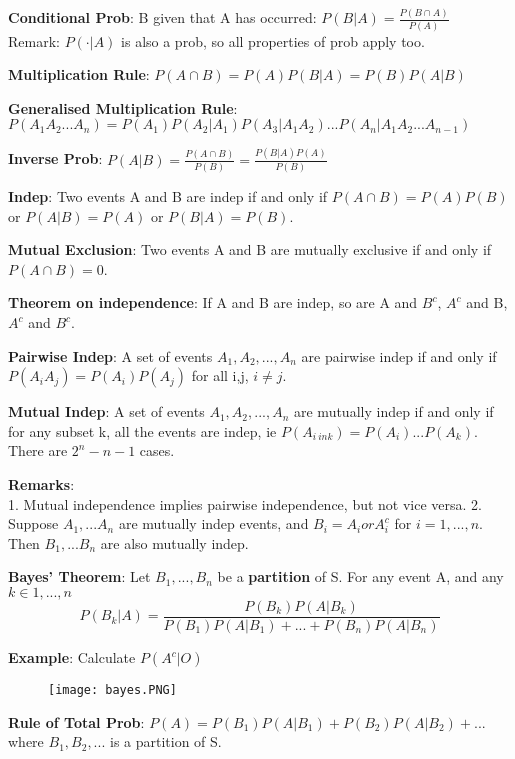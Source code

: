 \documentclass[a4paper,landscape]{article}
\newcommand{\rnname}[1]{\textbf{#1}}
\begin{document}
\begin{multicols*}{4}
\begin{flatitemize}
\item \rnname{Conditional Prob}: B given that A has occurred: $P(B|A) = \frac{P(B \cap A)}{P(A)}$ \\
Remark: $P(\cdot | A)$ is also a prob, so all properties of prob apply too.
\item \rnname{Multiplication Rule}: $P(A \cap B) = P(A)P(B|A) = P(B)P(A|B)$
\item \rnname{Generalised Multiplication Rule}: $P(A_1A_2...A_n) = P(A_1)P(A_2|A_1)P(A_3|A_1A_2)...P(A_n|A_1A_2...A_{n-1})$
\item \rnname{Inverse Prob}: $P(A|B) = \frac{P(A\cap B)}{P(B)} = \frac{P(B|A)P(A)}{P(B)}$
\item\rnname{Indep}: Two events A and B are indep if and only if $P(A\cap B) = P(A)P(B)$ or $P(A|B) = P(A)$ or $P(B|A) = P(B)$.
\item \rnname{Mutual Exclusion}: Two events A and B are mutually exclusive if and only if $P(A \cap B) = 0$.
\item \rnname{Theorem on independence}: If A and B are indep, so are A and $B^c$, $A^c$ and B, $A^c$ and $B^c$.
\item \rnname{Pairwise Indep}: A set of events $A_1,A_2,...,A_n$ are pairwise indep if and only if $P(A_iA_j) = P(A_i)P(A_j)$ for all i,j, $i \neq j$.
\item \rnname{Mutual Indep}: A set of events $A_1,A_2,...,A_n$ are mutually indep if and only if for any subset k, all the events are indep, ie $P(A_{i \ in k}) = P(A_i)...P(A_k)$. There are $2^n - n - 1$ cases.
\item \rnname{Remarks}: \\
1. Mutual independence implies pairwise independence, but not vice versa.
2. Suppose $A_1,...A_n$ are mutually indep events, and $B_i = A_i or A_i^c$ for $i = 1,...,n$. Then $B_1,...B_n$ are also mutually indep. 
\item \rnname{Bayes' Theorem}: Let $B_1, ..., B_n$ be a \textbf{partition} of S. For any event A, and any $k \in 1, ..., n$ \\
$$P(B_k|A) = \frac{P(B_k)P(A|B_k)}{P(B_1)P(A|B_1)+ ... + P(B_n)P(A|B_n)}$$
\item \rnname{Example}: Calculate $P(A^c|O)$
\vspace{-0.5cm}
    \begin{figure}[H]
        \texttt{[image: bayes.PNG]}
    \end{figure}
\vspace{-0.5cm}
\item \rnname{Rule of Total Prob}: $P(A) = P(B_1)P(A|B_1) + P(B_2)P(A|B_2) + ...$ where $B_1, B_2, ...$ is a partition of S.

\end{flatitemize}
\end{multicols*}
\end{document}
